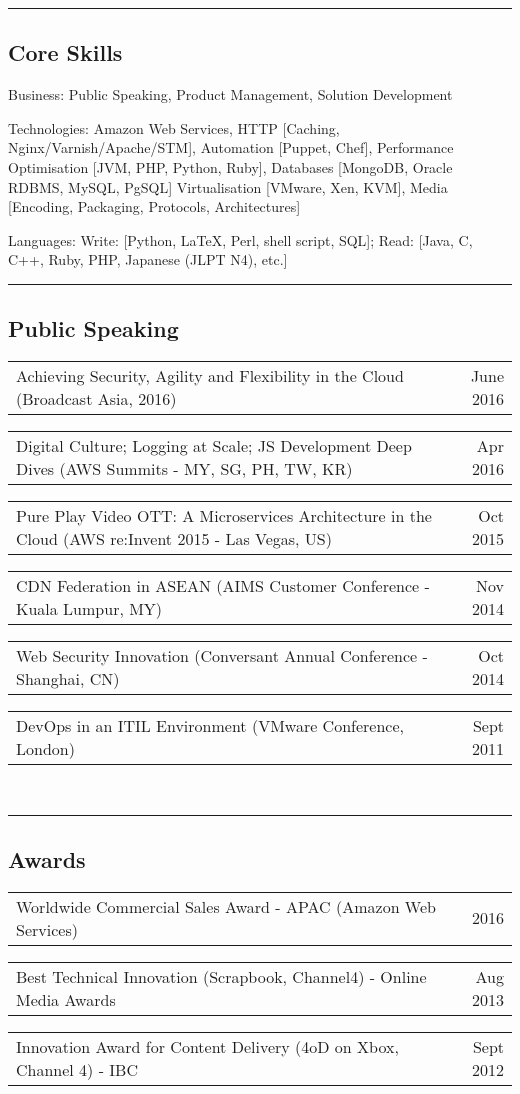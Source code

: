 \documentclass[10pt,a4paper]{article}
\makeatletter
\newenvironment{indentsection}[1]%
{\begin{list}{}%
    {\setlength{\leftmargin}{#1}}%
    \item[]%
}
{\end{list}}
\newcommand{\headerrow}[2]
{\begin{tabular*}{\linewidth}{l@{\extracolsep{\fill}}r}
    #1 &
    #2 \\
\end{tabular*}}
\makeatother
\begin{document}
\hrule
\vspace{-0.4em}
\subsection*{Core Skills}

\begin{indentsection}{\parindent}
\begin{description*}
    \item[Business:]
    Public Speaking, Product Management, Solution Development 
    \item[Technologies:]
    Amazon Web Services, HTTP [Caching, Nginx/Varnish/Apache/STM], Automation [Puppet, Chef], Performance Optimisation [JVM, PHP, Python, Ruby], Databases [MongoDB, Oracle RDBMS, MySQL, PgSQL] Virtualisation [VMware, Xen, KVM], Media [Encoding, Packaging, Protocols, Architectures]
    \item[Languages:]
    Write: [Python, \LaTeX, Perl, shell script, SQL]; Read: [Java, C, C++, Ruby, PHP, Japanese (JLPT N4), etc.]
\end{description*}
\end{indentsection}

\hrule
\vspace{-0.4em}
\subsection*{Public Speaking}
    \headerrow
        {Achieving Security, Agility and Flexibility in the Cloud (Broadcast Asia, 2016)}
        {June 2016}
    \headerrow
        {Digital Culture; Logging at Scale; JS Development Deep Dives (AWS Summits - MY, SG, PH, TW, KR)}
        {Apr 2016}
    \headerrow
        {Pure Play Video OTT: A Microservices Architecture in the Cloud (AWS re:Invent 2015 - Las Vegas, US)}
        {Oct 2015}
    \headerrow
        {CDN Federation in ASEAN (AIMS Customer Conference - Kuala Lumpur, MY)}
        {Nov 2014}
    \headerrow
        {Web Security Innovation (Conversant Annual Conference - Shanghai, CN)}
        {Oct 2014}
    \headerrow
        {DevOps in an ITIL Environment (VMware Conference, London)}
        {Sept 2011}
\\
\hrule
\vspace{-0.4em}
\subsection*{Awards}
    \headerrow
        {Worldwide Commercial Sales Award - APAC (Amazon Web Services)}
        {2016}
    \headerrow
        {Best Technical Innovation (Scrapbook, Channel4) - Online Media Awards}
        {Aug 2013}
    \headerrow
        {Innovation Award for Content Delivery (4oD on Xbox, Channel 4) - IBC}
        {Sept 2012}
\end{document}
